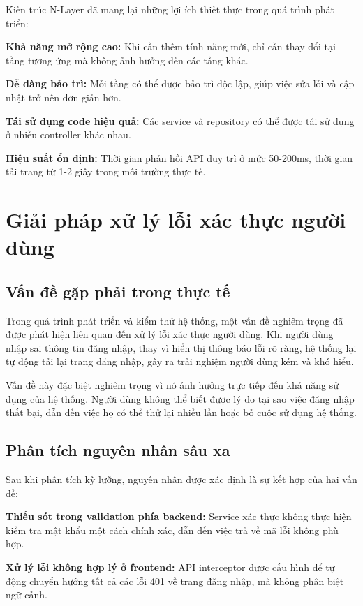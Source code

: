 Kiến trúc N-Layer đã mang lại những lợi ích thiết thực trong quá trình phát triển:

\textbf{Khả năng mở rộng cao:} Khi cần thêm tính năng mới, chỉ cần thay đổi tại tầng tương ứng mà không ảnh hưởng đến các tầng khác.

\textbf{Dễ dàng bảo trì:} Mỗi tầng có thể được bảo trì độc lập, giúp việc sửa lỗi và cập nhật trở nên đơn giản hơn.

\textbf{Tái sử dụng code hiệu quả:} Các service và repository có thể được tái sử dụng ở nhiều controller khác nhau.

\textbf{Hiệu suất ổn định:} Thời gian phản hồi API duy trì ở mức 50-200ms, thời gian tải trang từ 1-2 giây trong môi trường thực tế.

\section{Giải pháp xử lý lỗi xác thực người dùng}

\subsection{Vấn đề gặp phải trong thực tế}

Trong quá trình phát triển và kiểm thử hệ thống, một vấn đề nghiêm trọng đã được phát hiện liên quan đến xử lý lỗi xác thực người dùng. Khi người dùng nhập sai thông tin đăng nhập, thay vì hiển thị thông báo lỗi rõ ràng, hệ thống lại tự động tải lại trang đăng nhập, gây ra trải nghiệm người dùng kém và khó hiểu.

Vấn đề này đặc biệt nghiêm trọng vì nó ảnh hưởng trực tiếp đến khả năng sử dụng của hệ thống. Người dùng không thể biết được lý do tại sao việc đăng nhập thất bại, dẫn đến việc họ có thể thử lại nhiều lần hoặc bỏ cuộc sử dụng hệ thống.

\subsection{Phân tích nguyên nhân sâu xa}

Sau khi phân tích kỹ lưỡng, nguyên nhân được xác định là sự kết hợp của hai vấn đề:

\textbf{Thiếu sót trong validation phía backend:} Service xác thực không thực hiện kiểm tra mật khẩu một cách chính xác, dẫn đến việc trả về mã lỗi không phù hợp.

\textbf{Xử lý lỗi không hợp lý ở frontend:} API interceptor được cấu hình để tự động chuyển hướng tất cả các lỗi 401 về trang đăng nhập, mà không phân biệt ngữ cảnh.

